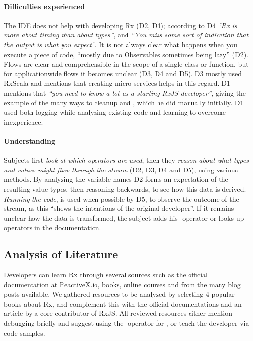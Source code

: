 \paragraph{Difficulties experienced} The IDE does not help with
developing Rx (D2, D4); according to D4 \emph{``Rx is more about timing
than about types''}, and \emph{``You miss some sort of indication that
the output is what you expect''}.  It is not always clear what happens
when you execute a piece of code, ``mostly due to Observables sometimes
being lazy'' (D2).  Flows are clear and comprehensible in the scope of a
single class or function, but for applicationwide flows it becomes
unclear (D3, D4 and D5).  D3 mostly used RxScala and mentions that
creating micro services helps in this regard.  D1 mentions that \emph{``you
need to know a lot as a starting {\lbrack}RxJS{\rbrack} developer''},
giving the example of the many ways to cleanup and ,
which he did manually initially.  D1 used both logging while analyzing
existing code and learning to overcome inexperience.

\paragraph{Understanding} Subjects first \emph{look at which
operators are used}, then they \emph{reason about what types and values
might flow through the stream} (D2, D3, D4 and D5), using various
methods.  By analyzing the variable names D2 forms an expectation of the
resulting value types, then reasoning backwards, to see how this data is
derived.  \emph{Running the code}, is used when possible by D5, to
observe the outcome of the stream, as this ``shows the intentions of the
original developer''.  If it remains unclear how the data is
transformed, the subject adds his -operator or looks up
operators in the documentation.

\subsection{Analysis of Literature} Developers can learn Rx through
several sources such as the official documentation at \href{http://reactivex.io}
{ReactiveX.io}, books, online courses and from the many blog posts
available.  We gathered resources to be analyzed by selecting 4 popular
books about Rx, and complement this with the official documentations and
an article by a core contributor of RxJS.  All reviewed resources either
mention debugging briefly and suggest using the -operator for
\printfdebugging{}, or teach the developer \printfdebugging{} via code
samples.

